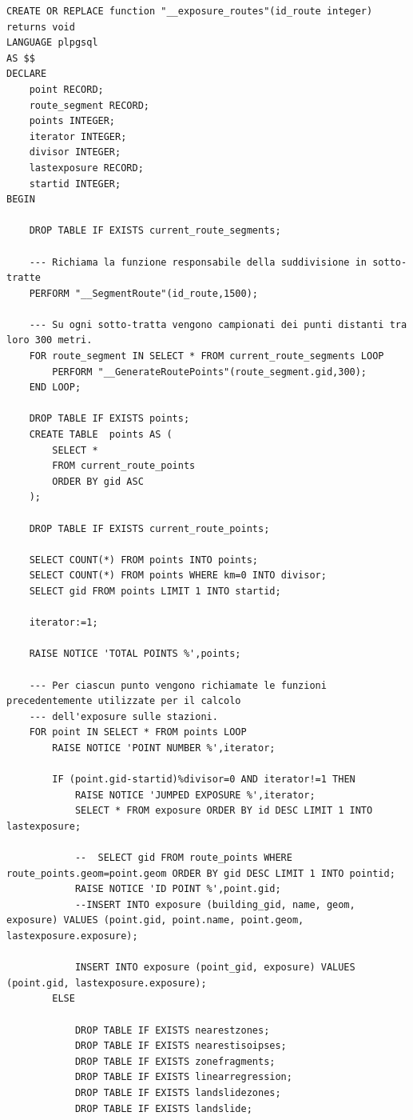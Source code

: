 \begin{lstlisting}[style = mystyle]
CREATE OR REPLACE function "__exposure_routes"(id_route integer) returns void
LANGUAGE plpgsql
AS $$
DECLARE
	point RECORD;
	route_segment RECORD;
	points INTEGER;
	iterator INTEGER;
	divisor INTEGER;
	lastexposure RECORD;
	startid INTEGER;
BEGIN

	DROP TABLE IF EXISTS current_route_segments;
	
	--- Richiama la funzione responsabile della suddivisione in sotto-tratte 
	PERFORM "__SegmentRoute"(id_route,1500);

	--- Su ogni sotto-tratta vengono campionati dei punti distanti tra loro 300 metri.
	FOR route_segment IN SELECT * FROM current_route_segments LOOP
		PERFORM "__GenerateRoutePoints"(route_segment.gid,300);
	END LOOP;

	DROP TABLE IF EXISTS points;
	CREATE TABLE  points AS (
		SELECT * 
		FROM current_route_points 
		ORDER BY gid ASC
	);
	
	DROP TABLE IF EXISTS current_route_points;

	SELECT COUNT(*) FROM points INTO points;
	SELECT COUNT(*) FROM points WHERE km=0 INTO divisor;
	SELECT gid FROM points LIMIT 1 INTO startid;
	
	iterator:=1;
	
	RAISE NOTICE 'TOTAL POINTS %',points;
	
	--- Per ciascun punto vengono richiamate le funzioni precedentemente utilizzate per il calcolo
	--- dell'exposure sulle stazioni.
	FOR point IN SELECT * FROM points LOOP
		RAISE NOTICE 'POINT NUMBER %',iterator;
		
		IF (point.gid-startid)%divisor=0 AND iterator!=1 THEN
			RAISE NOTICE 'JUMPED EXPOSURE %',iterator;
			SELECT * FROM exposure ORDER BY id DESC LIMIT 1 INTO lastexposure;

			--  SELECT gid FROM route_points WHERE route_points.geom=point.geom ORDER BY gid DESC LIMIT 1 INTO pointid;
			RAISE NOTICE 'ID POINT %',point.gid;
			--INSERT INTO exposure (building_gid, name, geom, exposure) VALUES (point.gid, point.name, point.geom, lastexposure.exposure);

			INSERT INTO exposure (point_gid, exposure) VALUES (point.gid, lastexposure.exposure);
		ELSE

			DROP TABLE IF EXISTS nearestzones;
			DROP TABLE IF EXISTS nearestisoipses;
			DROP TABLE IF EXISTS zonefragments;
			DROP TABLE IF EXISTS linearregression;
			DROP TABLE IF EXISTS landslidezones;
			DROP TABLE IF EXISTS landslide;
	

\end{lstlisting}
